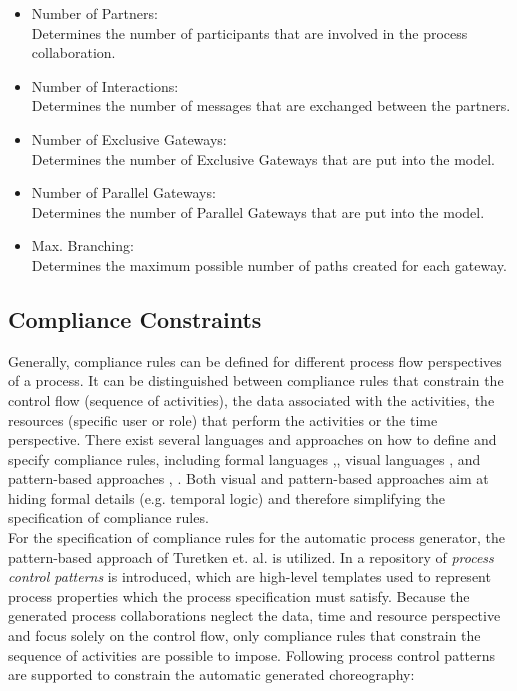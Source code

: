 \documentclass[runningheads]{llncs}
\begin{document}
\begin{itemize}
\item Number of Partners: \\Determines the number of participants that are involved in the process collaboration.
\item Number of Interactions: \\Determines the number of messages that are exchanged between the partners.
\item Number of Exclusive Gateways: \\Determines the number of Exclusive Gateways that are put into the model.
\item Number of Parallel Gateways: \\Determines the number of Parallel Gateways that are put into the model.
\item Max. Branching: \\Determines the maximum possible number of paths created for each gateway.
\end{itemize}

\subsection{Compliance Constraints} \label{sec:conception_compliance}

Generally, compliance rules can be defined for different process flow perspectives of a process. It can be distinguished between compliance rules that constrain the control flow (sequence of activities), the data associated with the activities, the resources (specific user or role) that perform the activities or the time perspective. There exist several languages and approaches on how to define and specify compliance rules, including formal languages \cite{Ghose2007},\cite{GovMilSad:edoc:06:compliance}, visual languages \cite{sabrina953},\cite{Awad2008} and pattern-based approaches \cite{compliance_patterns}, \cite{Ramezani2012}. Both visual and pattern-based approaches aim at hiding formal details (e.g. temporal logic) and therefore simplifying the specification of compliance rules. \\

For the specification of compliance rules for the automatic process generator, the pattern-based approach of Turetken et. al. \cite{compliance_patterns} is utilized. In \cite{compliance_patterns} a repository of \textit{process control patterns} is introduced, which are high-level templates used to represent process properties which the process specification must satisfy. Because the generated process collaborations neglect the data, time and resource perspective and focus solely on the control flow, only compliance rules that constrain the sequence of activities are possible to impose. Following process control patterns are supported to constrain the automatic generated choreography:
\end{document}
